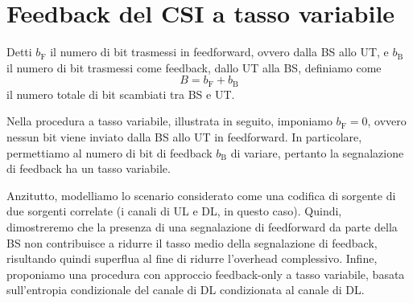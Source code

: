 \chapter{Feedback del CSI a tasso variabile}

\thispagestyle{empty}

Detti \(b_\mathrm{F}\) il numero di bit trasmessi in feedforward, ovvero dalla
BS allo UT, e \(b_\mathrm{B}\) il numero di bit trasmessi come feedback, dallo
UT alla BS, definiamo come
\[
    B = b_\mathrm{F} + b_\mathrm{B}
\]
il numero totale di bit scambiati tra BS e UT.

Nella procedura a tasso variabile, illustrata in seguito, imponiamo
\(b_\mathrm{F} = 0\), ovvero nessun bit viene inviato dalla BS allo UT in
feedforward. In particolare, permettiamo al numero di bit di feedback
\(b_\mathrm{B}\) di variare, pertanto la segnalazione di feedback ha un tasso
variabile.

Anzitutto, modelliamo lo scenario considerato come una codifica di sorgente di
due sorgenti correlate (i canali di UL e DL, in questo caso).  Quindi,
dimostreremo che la presenza di una segnalazione di feedforward da parte della
BS non contribuisce a ridurre il tasso medio della segnalazione di feedback,
risultando quindi superflua al fine di ridurre l'overhead complessivo. Infine,
proponiamo una procedura con approccio feedback-only a tasso variabile, basata
sull'entropia condizionale del canale di DL condizionata al canale di DL.

\lipsum[4]  %






